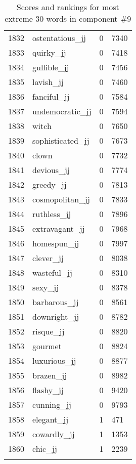 \begin{longtable}[!htbp]{| rlr@{.}l |}
    1832 & ostentatious\_jj & 0 & 7340 \\
    1833 & quirky\_jj & 0 & 7418 \\
    1834 & gullible\_jj & 0 & 7456 \\
    1835 & lavish\_jj & 0 & 7460 \\
    1836 & fanciful\_jj & 0 & 7584 \\
    1837 & undemocratic\_jj & 0 & 7594 \\
    1838 & witch & 0 & 7650 \\
    1839 & sophisticated\_jj & 0 & 7673 \\
    1840 & clown & 0 & 7732 \\
    1841 & devious\_jj & 0 & 7774 \\
    1842 & greedy\_jj & 0 & 7813 \\
    1843 & cosmopolitan\_jj & 0 & 7833 \\
    1844 & ruthless\_jj & 0 & 7896 \\
    1845 & extravagant\_jj & 0 & 7968 \\
    1846 & homespun\_jj & 0 & 7997 \\
    1847 & clever\_jj & 0 & 8038 \\
    1848 & wasteful\_jj & 0 & 8310 \\
    1849 & sexy\_jj & 0 & 8378 \\
    1850 & barbarous\_jj & 0 & 8561 \\
    1851 & downright\_jj & 0 & 8782 \\
    1852 & risque\_jj & 0 & 8820 \\
    1853 & gourmet & 0 & 8824 \\
    1854 & luxurious\_jj & 0 & 8877 \\
    1855 & brazen\_jj & 0 & 8982 \\
    1856 & flashy\_jj & 0 & 9420 \\
    1857 & cunning\_jj & 0 & 9793 \\
    1858 & elegant\_jj & 1 & 471 \\
    1859 & cowardly\_jj & 1 & 1353 \\
    1860 & chic\_jj & 1 & 2239 \\
    \hline
    \caption{Scores and rankings for most extreme 30 words in component \#9} \\
\end{longtable}
